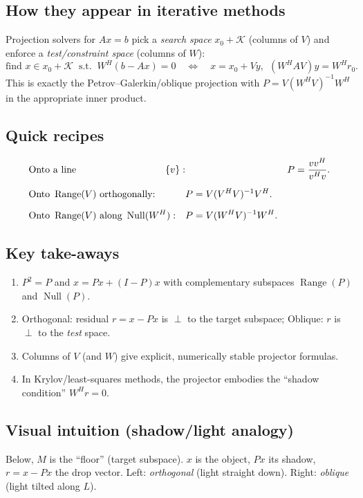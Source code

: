 \subsection*{How they appear in iterative methods}
Projection solvers for \(Ax=b\) pick a \emph{search space} \(x_0+\mathcal{K}\) (columns of \(V\)) and enforce a \emph{test/constraint space} (columns of \(W\)):
\[
    \text{find }x\in x_0+\mathcal{K}\ \text{ s.t. }\ W^H(b-Ax)=0
    \quad\Longleftrightarrow\quad
    x = x_0 + V y,\ \ (W^HAV)y=W^Hr_0.
\]
This is exactly the Petrov--Galerkin/oblique projection with \(P=V(W^HV)^{-1}W^H\) in the appropriate inner product.

\subsection*{Quick recipes}
\begin{align*}
     & \text{Onto a line } \span\{v\}:                 &  & P=\frac{vv^H}{v^Hv}. \\[2mm]
     & \text{Onto } \operatorname{Range}(V) \text{ orthogonally:}      &  & P=V(V^HV)^{-1}V^H.   \\[2mm]
     & \text{Onto } \operatorname{Range}(V) \text{ along } \operatorname{Null}(W^H): &  & P=V(W^HV)^{-1}W^H.
\end{align*}

\subsection*{Key take-aways}
\begin{enumerate}
    \item \(P^2=P\) and \(x=Px+(I-P)x\) with complementary subspaces \(\operatorname{Range}(P)\) and \(\operatorname{Null}(P)\).
    \item Orthogonal: residual \(r=x-Px\) is \(\perp\) to the target subspace; Oblique: \(r\) is \(\perp\) to the \emph{test} space.
    \item Columns of \(V\) (and \(W\)) give explicit, numerically stable projector formulas.
    \item In Krylov/least-squares methods, the projector embodies the “shadow condition” \(W^Hr=0\).
\end{enumerate}

\subsection*{Visual intuition (shadow/light analogy)}
Below, \(M\) is the ``floor'' (target subspace). \(x\) is the object, \(Px\) its shadow, \(r=x-Px\) the drop vector.
Left: \emph{orthogonal} (light straight down). Right: \emph{oblique} (light tilted along \(L\)).

